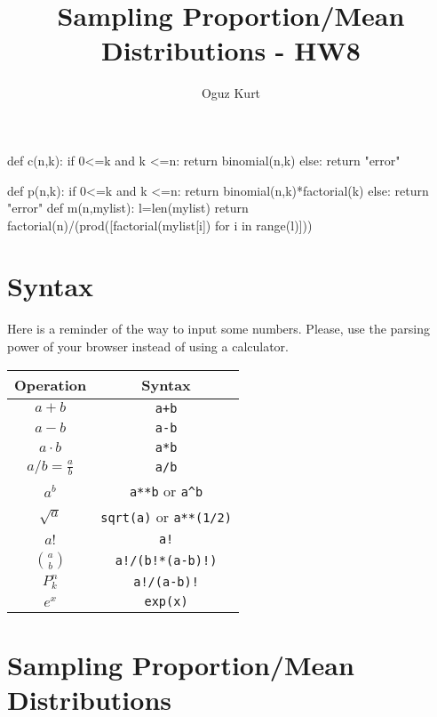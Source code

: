 \documentclass{ximera}
\title{Sampling Proportion/Mean Distributions - HW8}
\author{Oguz Kurt}
\begin{document}
\begin{abstract}
\empty
\end{abstract}
\maketitle
\begin{sagesilent}
def c(n,k):
    if 0<=k and k <=n:
        return binomial(n,k)
    else:
        return "error"

def p(n,k):
    if 0<=k and k <=n:
        return binomial(n,k)*factorial(k)
    else:
        return "error"
def m(n,mylist):
    l=len(mylist)
    return factorial(n)/(prod([factorial(mylist[i]) for i in range(l)]))
\end{sagesilent}



\section*{Syntax}
Here is a reminder of the way to input some numbers. Please, use the parsing power of your browser instead of using a calculator.

\hspace{0.5cm}


\begin{tabular}{c|c}
Operation & Syntax  
\\
\hline
$a+b$ & {\color{red} \verb!a+b!} 
\\
\hline
$a- b$ & {\color{red} \verb!a-b!} 
\\
\hline
$a\cdot b$ & {\color{red} \verb!a*b! } 
\\
\hline
$a/b=\frac{a}{b}$ & {\color{red} \verb!a/b!}
\\
\hline
$a^b$ & {\color{red} \verb|a**b| or \verb|a^b|} 
\\
\hline
$\sqrt{a}$ & {\color{red} \verb|sqrt(a)| or \verb|a**(1/2)|} 
\\
\hline
$a!$ & {\color{red} \verb|a!|} 
\\
\hline
$\binom{a}{b}$ & {\color{red} \verb|a!/(b!*(a-b)!)|}
\\
\hline
$P_k^n$ & {\color{red} \verb|a!/(a-b)!|}
\\
\hline
$e^x$ & {\color{red} \verb|exp(x)|}
\\
\end{tabular}

\section*{Sampling Proportion/Mean Distributions}
\end{document}
